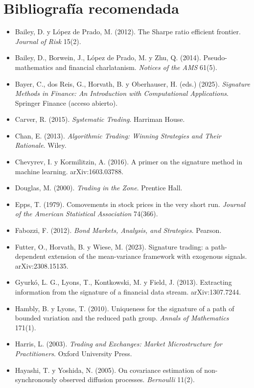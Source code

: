 \chapter*{Bibliografía recomendada}
\small
\begin{itemize}
\item Bailey, D. y López de Prado, M. (2012). The Sharpe ratio efficient frontier. \emph{Journal of Risk} 15(2).
\item Bailey, D., Borwein, J., López de Prado, M. y Zhu, Q. (2014). Pseudo-mathematics and financial charlatanism. \emph{Notices of the AMS} 61(5).
\item Bayer, C., dos Reis, G., Horvath, B. y Oberhauser, H. (eds.) (2025). \emph{Signature Methods in Finance: An Introduction with Computational Applications}. Springer Finance (acceso abierto).
\item Carver, R. (2015). \emph{Systematic Trading}. Harriman House.
\item Chan, E. (2013). \emph{Algorithmic Trading: Winning Strategies and Their Rationale}. Wiley.
\item Chevyrev, I. y Kormilitzin, A. (2016). A primer on the signature method in machine learning. arXiv:1603.03788.
\item Douglas, M. (2000). \emph{Trading in the Zone}. Prentice Hall.
\item Epps, T. (1979). Comovements in stock prices in the very short run. \emph{Journal of the American Statistical Association} 74(366).
\item Fabozzi, F. (2012). \emph{Bond Markets, Analysis, and Strategies}. Pearson.
\item Futter, O., Horvath, B. y Wiese, M. (2023). Signature trading: a path-dependent extension of the mean-variance framework with exogenous signals. arXiv:2308.15135.
\item Gyurkó, L. G., Lyons, T., Kontkowski, M. y Field, J. (2013). Extracting information from the signature of a financial data stream. arXiv:1307.7244.
\item Hambly, B. y Lyons, T. (2010). Uniqueness for the signature of a path of bounded variation and the reduced path group. \emph{Annals of Mathematics} 171(1).
\item Harris, L. (2003). \emph{Trading and Exchanges: Market Microstructure for Practitioners}. Oxford University Press.
\item Hayashi, T. y Yoshida, N. (2005). On covariance estimation of non-synchronously observed diffusion processes. \emph{Bernoulli} 11(2).

\end{itemize}
